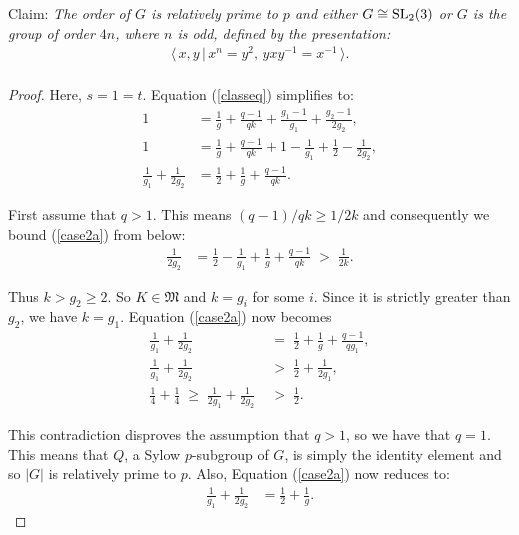 \begin{theorem}[Case II]
\label{case_II}
\leanok
Claim: \textit{The order of $G$ is relatively prime to $p$ and either $G \cong \operatorname{SL}_2(3)$ or $G$ is the group of order $4n$, where $n$ is odd, defined by the presentation:}
\begin{align*} 
    \langle \, x,y \, | \, x^n = y^2, \, yxy^{-1} = x^{-1} \, \rangle. \\
\end{align*}
\end{theorem}
\begin{proof} 
    Here, $s = 1 = t$. Equation (\ref{classeq}) simplifies to:
\begin{align}\label{case2a} 1 &= \frac{1}{g} + \frac{q-1}{qk} + \frac{g_1-1}{g_1} +  \frac{g_2-1}{2g_2}, \nonumber
\\ 1 &= \frac{1}{g} + \frac{q-1}{qk} + 1 - \frac{1}{g_1} + \frac{1}{2} - \frac{1}{2g_2}, \nonumber
\\ \frac{1}{g_1}  + \frac{1}{2g_2} &= \frac{1}{2} + \frac{1}{g} + \frac{q-1}{qk}.
\end{align}

First assume that $q>1$. This means $(q-1)/qk \geq 1/2k$ and consequently we bound (\ref{case2a}) from below:
\begin{align*} \frac{1}{2g_2} &= \frac{1}{2} - \frac{1}{g_1} + \frac{1}{g} + \frac{q-1}{qk} \; > \; \frac{1}{2k}.
\end{align*}

Thus $k > g_2 \geq 2$. So $K \in \mathfrak{M}$ and $k=g_i$ for some $i$. Since it is strictly greater than $g_2$, we have $k=g_1$. Equation (\ref{case2a}) now becomes
\begin{align*} \frac{1}{g_1}  + \frac{1}{2g_2} \; &= \; \frac{1}{2} + \frac{1}{g} + \frac{q-1}{qg_1},
\\ \frac{1}{g_1}  + \frac{1}{2g_2} \; &> \; \frac{1}{2} + \frac{1}{2g_1},
\\ \frac{1}{4} + \frac{1}{4} \; \geq \; \frac{1}{2g_1}  + \frac{1}{2g_2} \; &> \; \frac{1}{2}.
\end{align*}

This contradiction disproves the assumption that $q > 1$, so we have that $q = 1$. This means that $Q$, a Sylow $p$-subgroup of $G$, is simply the identity element and so $|G|$ is relatively prime to $p$. Also, Equation (\ref{case2a}) now reduces to:
\begin{align}\label{case2b} \frac{1}{g_1}  + \frac{1}{2g_2} &= \frac{1}{2} + \frac{1}{g}.
\end{align}


\end{proof}
